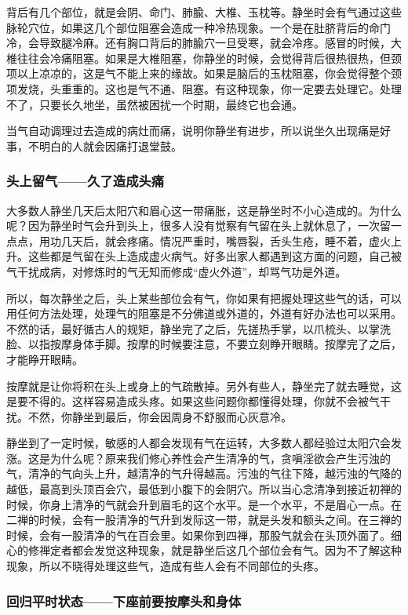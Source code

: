 \documentclass{book}
\begin{document}
背后有几个部位，就是会阴、命门、肺腧、大椎、玉枕等。静坐时会有气通过这些脉轮穴位，如果这几个部位阻塞会造成一种冷热现象。一个是在肚脐背后的命门冷，会导致腿冷麻。还有胸口背后的肺腧穴一旦受寒，就会冷疼。感冒的时候，大椎往往会冷痛阻塞。如果是大椎阻塞，你静坐的时候，会觉得背后很热很热，但颈项以上凉凉的，这是气不能上来的缘故。如果是脑后的玉枕阻塞，你会觉得整个颈项发烧，头重重的。这也是气不通、阻塞。有这种现象，你一定要去处理它。处理不了，只要长久地坐，虽然被困扰一个时期，最终它也会通。

当气自动调理过去造成的病灶而痛，说明你静坐有进步，所以说坐久出现痛是好事，不明白的人就会因痛打退堂鼓。

\subsubsection{头上留气——久了造成头痛}

大多数人静坐几天后太阳穴和眉心这一带痛胀，这是静坐时不小心造成的。为什么呢？因为静坐时气会升到头上，很多人没有觉察有气留在头上就休息了，一次留一点点，用功几天后，就会疼痛。情况严重时，嘴唇裂，舌头生疮，睡不着，虚火上升。这些都是气留在头上造成虚火病气。好多出家人都遇到这方面的问题，自己被气干扰成病，对修炼时的气无知而修成``虚火外道''，却骂气功是外道。

所以，每次静坐之后，头上某些部位会有气，你如果有把握处理这些气的话，可以用任何方法处理，处理气的阻塞是不分佛道或外道的，外道有好办法也可以采用。不然的话，最好循古人的规矩，静坐完了之后，先搓热手掌，以爪梳头、以掌洗脸、以指按摩身体手脚。按摩的时候要注意，不要立刻睁开眼睛。按摩完了之后，才能睁开眼睛。

按摩就是让你将积在头上或身上的气疏散掉。另外有些人，静坐完了就去睡觉，这是要不得的。这样容易造成头疼。如果这些问题你都懂得处理，你就不会被气干扰。不然，你静坐到最后，你会因周身不舒服而心灰意冷。

静坐到了一定时候，敏感的人都会发现有气在运转，大多数人都经验过太阳穴会发涨。这是为什么呢？原来我们修心养性会产生清净的气，贪嗔淫欲会产生污浊的气，清净的气向头上升，越清净的气升得越高。污浊的气往下降，越污浊的气降的越低，最高到头顶百会穴，最低到小腹下的会阴穴。所以当心念清净到接近初禅的时候，你身上清净的气就会升到眉毛的这个水平。是一个水平，不是眉心一点。在二禅的时候，会有一股清净的气升到发际这一带，就是头发和额头之间。在三禅的时候，会有一股清净的气在百会里。如果你到四禅，那股气就会在头顶外面了。细心的修禅定者都会发觉这种现象，就是静坐后这几个部位会有气。因为不了解这种现象，所以不晓得处理这些气，造成有些人会有不同部位的头疼。

\subsubsection{回归平时状态——下座前要按摩头和身体}
\end{document}
